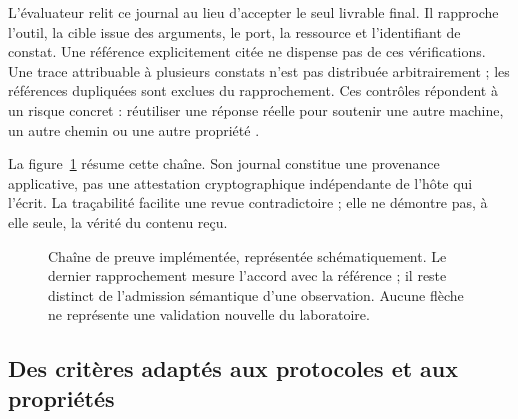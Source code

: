 \documentclass[11pt,a4paper]{article}
\begin{document}
L'évaluateur relit ce journal au lieu d'accepter le seul livrable final. Il
rapproche l'outil, la cible issue des arguments, le port, la ressource et
l'identifiant de constat. Une référence explicitement citée ne dispense pas
de ces vérifications. Une trace attribuable à plusieurs constats n'est pas
distribuée arbitrairement ; les références dupliquées sont exclues du
rapprochement. Ces contrôles répondent à un risque concret : réutiliser une
réponse réelle pour soutenir une autre machine, un autre chemin ou une autre
propriété \cite{sec-evaluateur}.

La figure~\ref{fig:sec-preuve} résume cette chaîne. Son journal constitue une
provenance applicative, pas une attestation cryptographique indépendante de
l'hôte qui l'écrit. La traçabilité facilite une revue contradictoire ; elle
ne démontre pas, à elle seule, la vérité du contenu reçu.

\begin{figure}[htbp]
\centering
{}
\caption{Chaîne de preuve implémentée, représentée schématiquement. Le dernier
rapprochement mesure l'accord avec la référence ; il reste distinct de
l'admission sémantique d'une observation. Aucune flèche ne représente une
validation nouvelle du laboratoire.}
\label{fig:sec-preuve}
\end{figure}

\subsection{Des critères adaptés aux protocoles et aux propriétés}
\end{document}
